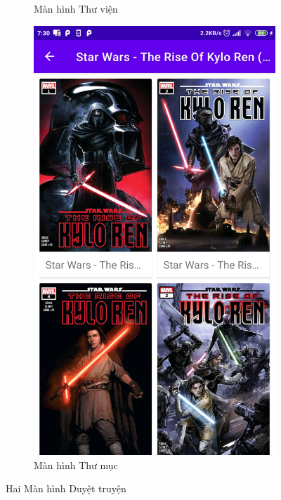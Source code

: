 \documentclass[../../thesis]{subfiles}
\begin{document}
\begin{figure}[H]
\begin{subfigure}[b]{0.49\textwidth}
        \caption{Màn hình Thư viện}
        \label{fig:library_screen}
    \end{subfigure}
    \hfill
    \begin{subfigure}[b]{0.49\textwidth}
        \centering
        \includegraphics[scale=0.12]{../images/Screenshot_2021-05-25-07-30-42-216_com.uet.nvmnghia.yacv}
        \caption{Màn hình Thư mục}
        \label{fig:folder_screen}
    \end{subfigure}
    \caption{Hai Màn hình Duyệt truyện}
    \label{fig:2-browsing-screens}
\end{figure}
\end{document}
